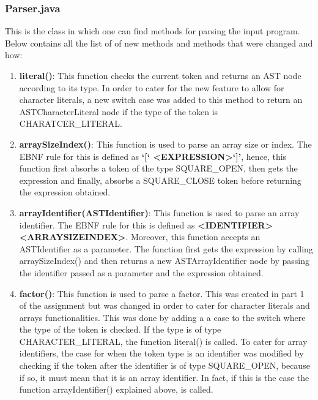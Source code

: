 \documentclass{article}
\begin{document}
									\subsubsection{Parser.java}
				
				This is the class in which one can find methods for parsing the input program. Below contains all the list of of new methods and  methods that were changed and how:
				
				\begin{enumerate}
				
				\item \textbf{literal()}: This function checks the current token and returns an AST node according to its type. In order to cater for the new feature to allow for character literals, a new switch case was added to this method to return an ASTCharacterLiteral node if the type of the token is CHARATCER\_LITERAL.
				
								\item \textbf{arraySizeIndex()}: This function is used to parse an array size or index. The EBNF rule for this is defined as \textbf{`[` \textless EXPRESSION\textgreater `]'}, hence, this function first absorbs a token of the type SQUARE\_OPEN, then gets the expression and finally, absorbs a SQUARE\_CLOSE token before returning the expression obtained.
								
				\item \textbf{arrayIdentifier(ASTIdentifier)}: This function is used to parse an array identifier. The EBNF rule for this is defined as \textbf{\textless IDENTIFIER\textgreater \textless ARRAYSIZEINDEX\textgreater}. Moreover, this function accepts an ASTIdentifier as a parameter. The function first gets the expression by calling arraySizeIndex() and then returns a new ASTArrayIdentifier node by passing the identifier passed as a parameter and the expression obtained.
				
\item \textbf{factor()}: This function is used to parse a factor. This was created in part 1 of the assignment but was changed in order to cater for character literals and arrays functionalities. This was done by adding a a case to the switch where the type of the token is checked. If the type is of type CHARACTER\_LITERAL, the function literal() is called. To cater for array identifiers, the case for when the token type is an identifier was modified by checking if the token after the identifier is of type SQUARE\_OPEN, because if so, it must mean that it is an array identifier. In fact, if this is the case the function arrayIdentifier() explained above, is called.
		

\end{enumerate}
\end{document}
